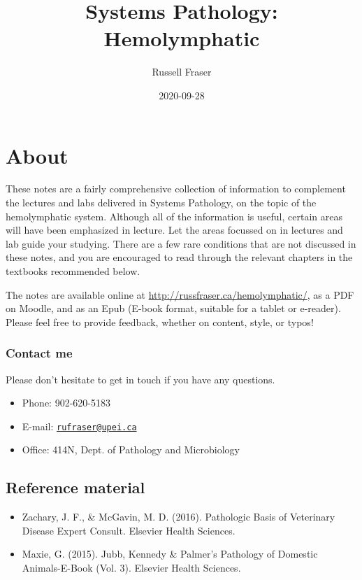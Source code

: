 \documentclass[openany]{article}
\title{Systems Pathology: Hemolymphatic}
\author{Russell Fraser}
\date{2020-09-28}
\providecommand{\tightlist}{%
  \setlength{\itemsep}{0pt}\setlength{\parskip}{0pt}}
\begin{document}
\maketitle

{
\setcounter{tocdepth}{2}
\tableofcontents
}
\section*{About}\label{about}

These notes are a fairly comprehensive collection of information to
complement the lectures and labs delivered in Systems Pathology, on the
topic of the hemolymphatic system. Although all of the information is
useful, certain areas will have been emphasized in lecture. Let the
areas focussed on in lectures and lab guide your studying. There are a
few rare conditions that are not discussed in these notes, and you are
encouraged to read through the relevant chapters in the textbooks
recommended below.

The notes are available online at
\url{http://russfraser.ca/hemolymphatic/}, as a PDF on Moodle, and as an
Epub (E-book format, suitable for a tablet or e-reader). Please feel
free to provide feedback, whether on content, style, or typos!

\subsubsection*{Contact me}\label{contact-me}

Please don't hesitate to get in touch if you have any questions.

\begin{itemize}
\tightlist
\item
  Phone: 902-620-5183
\item
  E-mail: \href{mailto:rufraser@upei.ca}{\nolinkurl{rufraser@upei.ca}}
\item
  Office: 414N, Dept. of Pathology and Microbiology
\end{itemize}

\subsection*{Reference material}\label{reference-material}

\begin{itemize}
\tightlist
\item
  Zachary, J. F., \& McGavin, M. D. (2016). Pathologic Basis of
  Veterinary Disease Expert Consult. Elsevier Health Sciences.
\item
  Maxie, G. (2015). Jubb, Kennedy \& Palmer's Pathology of Domestic
  Animals-E-Book (Vol. 3). Elsevier Health Sciences.
\end{itemize}
\end{document}
